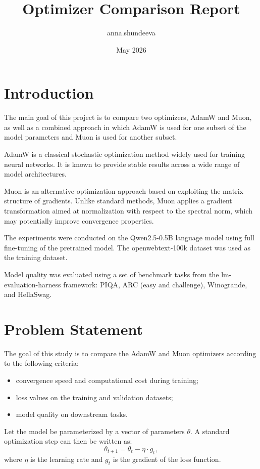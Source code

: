 \documentclass{article}
\title{Optimizer Comparison Report}
\author{anna.shundeeva }
\date{May 2026}
\begin{document}
\maketitle

\section{Introduction}

The main goal of this project is to compare two optimizers, AdamW and Muon, as well as a combined approach in which AdamW is used for one subset of the model parameters and Muon is used for another subset.

AdamW is a classical stochastic optimization method widely used for training neural networks. It is known to provide stable results across a wide range of model architectures.

Muon is an alternative optimization approach based on exploiting the matrix structure of gradients. Unlike standard methods, Muon applies a gradient transformation aimed at normalization with respect to the spectral norm, which may potentially improve convergence properties.

The experiments were conducted on the Qwen2.5-0.5B language model using full fine-tuning of the pretrained model. The openwebtext-100k dataset was used as the training dataset.

Model quality was evaluated using a set of benchmark tasks from the lm-evaluation-harness framework: PIQA, ARC (easy and challenge), Winogrande, and HellaSwag.

\section{Problem Statement}

The goal of this study is to compare the AdamW and Muon optimizers according to the following criteria:

\begin{itemize}
    \item convergence speed and computational cost during training;
    \item loss values on the training and validation datasets;
    \item model quality on downstream tasks.
\end{itemize}

Let the model be parameterized by a vector of parameters $\theta$. A standard optimization step can then be written as:
\[
\theta_{t+1} = \theta_t - \eta \cdot g_t,
\]
where $\eta$ is the learning rate and $g_t$ is the gradient of the loss function.
\end{document}
